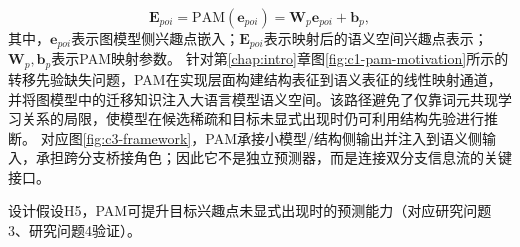 \begin{equation}
\mathbf{E}_{poi}=\text{PAM}(\mathbf{e}_{poi})=\mathbf{W}_{p}\mathbf{e}_{poi}+\mathbf{b}_{p},
\label{eq:c3-epoi}
\end{equation}
其中，$\mathbf{e}_{poi}$表示图模型侧兴趣点嵌入；$\mathbf{E}_{poi}$表示映射后的语义空间兴趣点表示；$\mathbf{W}_{p},\mathbf{b}_{p}$表示PAM映射参数。
针对第\ref{chap:intro}章图\ref{fig:c1-pam-motivation}所示的转移先验缺失问题，PAM在实现层面构建结构表征到语义表征的线性映射通道，并将图模型中的迁移知识注入大语言模型语义空间。该路径避免了仅靠词元共现学习关系的局限，使模型在候选稀疏和目标未显式出现时仍可利用结构先验进行推断。
对应图\ref{fig:c3-framework}，PAM承接小模型/结构侧输出并注入到语义侧输入，承担跨分支桥接角色；因此它不是独立预测器，而是连接双分支信息流的关键接口。

{\heiti{}设计假设H5，}PAM可提升目标兴趣点未显式出现时的预测能力（对应研究问题3、研究问题4验证）。


